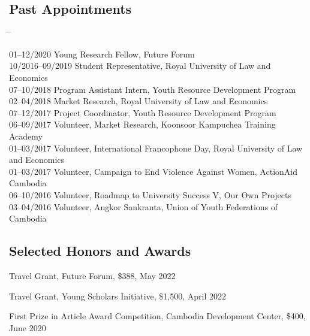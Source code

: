 \documentclass[10pt,a4paper]{article}
\newcommand{\tabbedblock}[1]{

	\begin{tabbing}
		\hspace{3cm} \= \hspace{4cm} \= \kill
		#1
	\end{tabbing}
}
\begin{document}
\subsection*{Past Appointments}

\tabbedblock{
	01--12/2020 \> Young Research Fellow, Future Forum\\

	10/2016--09/2019 \> Student Representative, Royal University of Law and Economics\\

	07--10/2018 \> Program Assistant Intern, Youth Resource Development Program\\

	02--04/2018 \> Market Research, Royal University of Law and Economics\\

	07--12/2017 \> Project Coordinator, Youth Resource Development Program\\ 

	06--09/2017 \> Volunteer, Market Research, Koonsoor Kampuchea Training Academy\\

	01--03/2017 \> Volunteer, International Francophone Day,  Royal University of Law and Economics\\

	01--03/2017 \> Volunteer, Campaign to End Violence Against Women, ActionAid Cambodia\\

	06--10/2016 \> Volunteer, Roadmap to University Success V, Our Own Projects\\

	03--04/2016 \> Volunteer, Angkor Sankranta, Union of Youth Federations of Cambodia
}

\subsection*{Selected Honors and Awards}

\parindent=0pt
	
	Travel Grant, Future Forum, \$388, May 2022 
	
	Travel Grant, Young Scholars Initiative, \$1,500, April 2022 
	
	First Prize in Article Award Competition, Cambodia Development Center, \$400, June 2020
	
\end{document}
